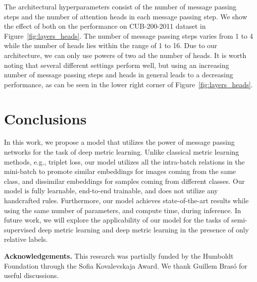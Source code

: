 \documentclass{article}
\begin{document}


The architectural hyperparameters consist of the number of message passing steps and the number of attention heads in each message passing step. We show the effect of both on the  performance on CUB-200-2011 dataset in Figure~\ref{fig:layers_heads}. The number of message passing steps varies from 1 to 4 while the number of heads lies within the range of 1 to 16. Due to our architecture, we can only use powers of two ad the number of heads. It is worth noting that several different settings perform well, but using an increasing number of message passing steps and heads in general leads to a decreasing performance, as can be seen in the lower right corner of Figure~\ref{fig:layers_heads}.
\fi
 
\vspace{0.2cm}
\section{Conclusions}
\vspace{0.2cm}

In this work, we propose a model that utilizes the power of message passing networks for the task of deep metric learning. Unlike classical metric learning methods, e.g., triplet loss, our model utilizes all the intra-batch relations in the mini-batch to promote similar embeddings for images coming from the same class, and dissimilar embeddings for samples coming from different classes. Our model is fully learnable, end-to-end trainable, and does not utilize any handcrafted rules. Furthermore, our model achieves state-of-the-art results while using the same number of parameters, and compute time, during inference. In future work, we will explore the applicability of our model for the tasks of semi-supervised deep metric learning and deep metric learning in the presence of only relative labels. 

\textbf{Acknowledgements.} This research was partially funded by the Humboldt Foundation through the Sofia Kovalevskaja Award. We thank Guillem Bras\'{o} for useful discussions.
 \appendix
\end{document}
